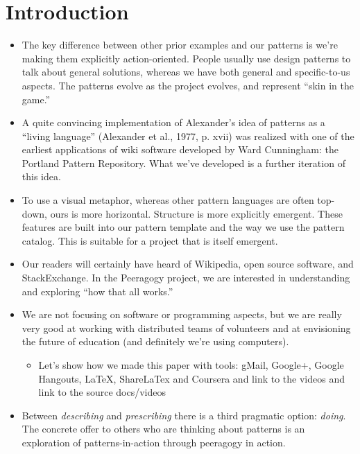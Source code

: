 \section{Introduction}

\begin{itemize}
\item The key difference between other prior examples and our
patterns is we're making them explicitly action-oriented.  People usually use design patterns to talk about general
solutions, whereas we have both general and specific-to-us aspects.
The patterns evolve as the project evolves, and represent ``skin in the game.''
\item A quite convincing implementation of Alexander’s idea of patterns as a “living language” (Alexander et
al., 1977, p. xvii) was realized with one of the earliest applications of wiki
software developed by Ward Cunningham: the Portland Pattern Repository.
What we've developed is a further iteration of this idea.
\item To use a visual metaphor, whereas other pattern languages are often top-down,
ours is more horizontal.  Structure is more explicitly emergent.  These features are built
into our pattern template and the way we use the pattern catalog.  This is suitable for a project
that is itself emergent.
\item Our readers will certainly have heard of Wikipedia, open source
software, and StackExchange.  In the Peeragogy project, we are interested in
understanding and exploring ``how that all works.''
\item We are not focusing on software or programming aspects, but we
are really very good at working with distributed teams of volunteers and
at envisioning the future of education (and definitely we're using
computers).
\begin{itemize}
\item Let's show how we made this paper with tools: gMail, Google+, Google Hangouts, LaTeX, ShareLaTex and Coursera and link to the videos and link to the source docs/videos
\end{itemize}
\item Between \emph{describing} and \emph{prescribing} there is a third pragmatic option: \emph{doing}.
The concrete offer to others who are thinking about patterns is an exploration of patterns-in-action
through peeragogy in action.
\end{itemize}